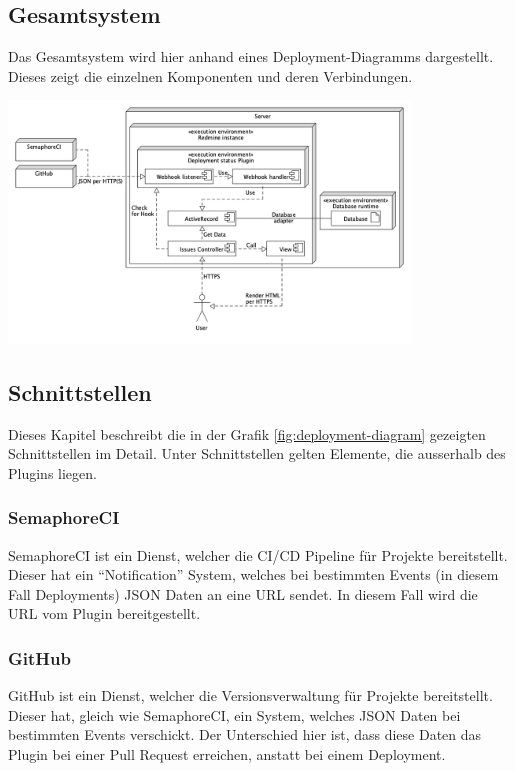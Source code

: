 \begin{minipage}{\textwidth}
    \subsection{Gesamtsystem}
    Das Gesamtsystem wird hier anhand eines Deployment-Diagramms dargestellt. Dieses zeigt die einzelnen Komponenten und deren Verbindungen.
    \begin{center}
        \includegraphics[width=0.8\textwidth]{images/deployment/standard.png}
        \label{fig:deployment-diagram}
    \end{center}
\end{minipage}

\subsection{Schnittstellen}
Dieses Kapitel beschreibt die in der Grafik \ref{fig:deployment-diagram} gezeigten Schnittstellen im Detail.
Unter Schnittstellen gelten Elemente, die ausserhalb des Plugins liegen.

\subsubsection{SemaphoreCI}
SemaphoreCI ist ein Dienst, welcher die CI/CD Pipeline für Projekte bereitstellt. Dieser hat ein
\enquote{Notification} System, welches bei bestimmten Events (in diesem Fall Deployments) JSON Daten
an eine URL sendet. In diesem Fall wird die URL vom Plugin bereitgestellt.

\subsubsection{GitHub}
GitHub ist ein Dienst, welcher die Versionsverwaltung für Projekte bereitstellt. Dieser hat, gleich wie
SemaphoreCI, ein System, welches JSON Daten bei bestimmten Events verschickt. Der Unterschied hier ist, dass
diese Daten das Plugin bei einer Pull Request erreichen, anstatt bei einem Deployment.

